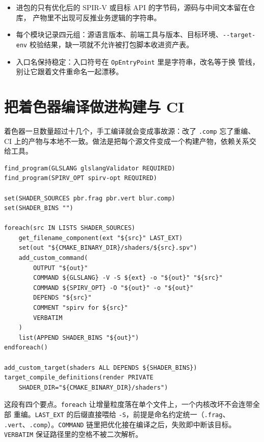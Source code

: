 \documentclass[12pt,a4paper,fontset=fandol]{ctexbook}
\newcommand{\Tp}[1]{\texttt{#1}}
\newcommand{\Opt}[1]{\texttt{-\/-#1}}
\newcommand{\Bk}{\discretionary{}{}{}}
\newcommand{\Lang}[1]{\textsf{#1}}
\newcommand{\SPIV}{\Lang{SPIR-V}}
\begin{document}
\begin{guideline}[title={模块发布的三条硬规则}]
\begin{itemize}
\item 进包的只有优化后的 \SPIV{} 或目标 API 的字节码，源码与中间文本留在仓库，
产物里不出现可反推业务逻辑的字符串。
\item 每个模块记录四元组：源语言版本、前端工具与版本、目标环境、\Opt{target-env}
校验结果，缺一项就不允许被打包脚本收进资产表。
\item 入口名保持稳定：入口符号在 \Tp{Op\Bk EntryPoint} 里是字符串，改名等于换
管线，别让它跟着文件重命名一起漂移。
\end{itemize}
\end{guideline}

\section{把着色器编译做进构建与 CI}

着色器一旦数量超过十几个，手工编译就会变成事故源：改了 \Tp{.comp} 忘了重编、CI
上的产物与本地不一致。做法是把每个源文件变成一个构建产物，依赖关系交给工具。

\begin{lstlisting}[style=cmakestyle,caption={CMake 里把 GLSL 逐文件编成 SPIR-V：源文件变更只触发对应产物},label={lst:ch07-cmake}]
find_program(GLSLANG glslangValidator REQUIRED)
find_program(SPIRV_OPT spirv-opt REQUIRED)

set(SHADER_SOURCES pbr.frag pbr.vert blur.comp)
set(SHADER_BINS "")

foreach(src IN LISTS SHADER_SOURCES)
    get_filename_component(ext "${src}" LAST_EXT)
    set(out "${CMAKE_BINARY_DIR}/shaders/${src}.spv")
    add_custom_command(
        OUTPUT "${out}"
        COMMAND ${GLSLANG} -V -S ${ext} -o "${out}" "${src}"
        COMMAND ${SPIRV_OPT} -O "${out}" -o "${out}"
        DEPENDS "${src}"
        COMMENT "spirv for ${src}"
        VERBATIM
    )
    list(APPEND SHADER_BINS "${out}")
endforeach()

add_custom_target(shaders ALL DEPENDS ${SHADER_BINS})
target_compile_definitions(render PRIVATE
    SHADER_DIR="${CMAKE_BINARY_DIR}/shaders")
\end{lstlisting}

这段有四个要点。\Tp{foreach} 让增量粒度落在单个文件上，一个内核改坏不会连带全部
重编。\Tp{LAST\_EXT} 的后缀直接喂给 \Tp{-S}，前提是命名约定统一（\Tp{.frag}、
\Tp{.vert}、\Tp{.comp}）。\Tp{COMMAND} 链里把优化接在编译之后，失败即中断该目标。
\Tp{VERBATIM} 保证路径里的空格不被二次解析。
\end{document}
